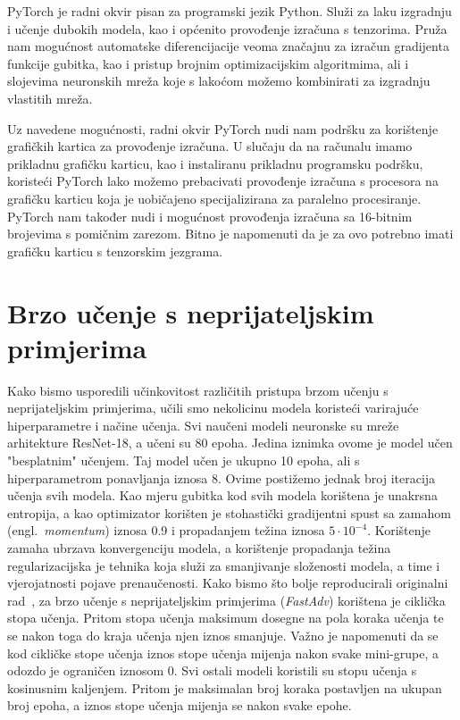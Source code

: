 \documentclass[times, utf8, zavrsni, numeric]{fer}
\begin{document}
PyTorch je radni okvir pisan za programski jezik Python.
Služi za laku izgradnju i učenje dubokih modela, kao i općenito provođenje izračuna s tenzorima.
Pruža nam mogućnost automatske diferencijacije veoma značajnu za izračun gradijenta funkcije gubitka, kao i pristup brojnim optimizacijskim algoritmima, 
ali i slojevima neuronskih mreža koje s lakoćom možemo kombinirati za izgradnju vlastitih mreža.

\pagebreak

Uz navedene mogućnosti, radni okvir PyTorch nudi nam podršku za korištenje grafičkih kartica za provođenje izračuna.
U slučaju da na računalu imamo prikladnu grafičku karticu, kao i instaliranu prikladnu programsku podršku, 
koristeći PyTorch lako možemo prebacivati provođenje izračuna s procesora na grafičku karticu koja je uobičajeno specijalizirana za paralelno procesiranje.
PyTorch nam također nudi i mogućnost provođenja izračuna sa 16-bitnim brojevima s pomičnim zarezom. Bitno je napomenuti da je za ovo potrebno imati grafičku karticu s tenzorskim jezgrama.

\section{Brzo učenje s neprijateljskim primjerima}

Kako bismo usporedili učinkovitost različitih pristupa brzom učenju s neprijateljskim primjerima, učili smo nekolicinu modela koristeći varirajuće hiperparametre i načine učenja.
Svi naučeni modeli neuronske su mreže arhitekture ResNet-18, a učeni su 80 epoha. Jedina iznimka ovome je model učen "besplatnim" učenjem. Taj model učen je ukupno 10 epoha, ali s hiperparametrom ponavljanja iznosa 8.
Ovime postižemo jednak broj iteracija učenja svih modela.
Kao mjeru gubitka kod svih modela korištena je unakrsna entropija, a kao optimizator korišten je stohastički gradijentni spust sa zamahom (engl.\ \textit{momentum}) iznosa 0.9 i propadanjem težina iznosa $5 \cdot 10^{-4}$.
Korištenje zamaha ubrzava konvergenciju modela, a korištenje propadanja težina regularizacijska je tehnika koja služi za smanjivanje složenosti modela, a time i vjerojatnosti pojave prenaučenosti.
Kako bismo što bolje reproducirali originalni rad~\cite{wong2020fast}, 
za brzo učenje s neprijateljskim primjerima (\textit{FastAdv}) korištena je ciklička stopa učenja. Pritom stopa učenja maksimum dosegne na pola koraka učenja te se nakon toga do kraja učenja njen iznos smanjuje. 
Važno je napomenuti da se kod cikličke stope učenja iznos stope učenja mijenja nakon svake mini-grupe, a odozdo je ograničen iznosom 0.
Svi ostali modeli koristili su stopu učenja s kosinusnim kaljenjem. Pritom je maksimalan broj koraka postavljen na ukupan broj epoha, a iznos stope učenja mijenja se nakon svake epohe.
\end{document}
